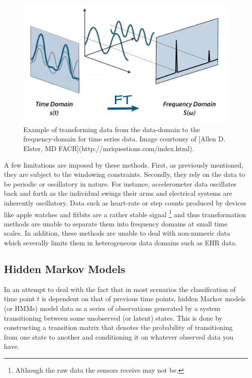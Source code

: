 \documentclass[]{book}
\let\rmarkdownfootnote\footnote%
\def\footnote{\protect\rmarkdownfootnote}
\theoremstyle{definition}
\theoremstyle{definition}
\theoremstyle{definition}
\theoremstyle{remark}
\begin{document}
\begin{figure}

{\centering \includegraphics[width=0.6\linewidth]{figures/fourier_transform} 

}

\caption{Example of transforming data from the data-domain to the frequency-domain for time series data. Image courtousy of [Allen D. Elster, MD FACR](http://mriquestions.com/index.html).}\label{fig:fouriertransform}
\end{figure}

A few limitations are imposed by these methods. First, as previously
mentioned, they are subject to the windowing constraints. Secondly, they
rely on the data to be periodic or oscillatory in nature. For instance,
accelerometer data oscillates back and forth as the individual swings
their arms and electrical systems are inherently oscillatory. Data such
as heart-rate or step counts produced by devices like apple watches and
fitbits are a rather stable signal \footnote{Although the raw data the
  sensors receive may not be.} and thus transformation methods are
unable to separate them into frequency domains at small time scales. In
addition, these methods are unable to deal with non-numeric data which
severally limits them in heterogeneous data domains such as EHR data.

\subsection{Hidden Markov Models}\label{hidden-markov-models}

In an attempt to deal with the fact that in most scenarios the
classification of time point \(t\) is dependent on that of previous time
points, hidden Markov models (or HMMs) model data as a series of
observations generated by a system transitioning between some unobserved
(or latent) states. This is done by constructing a transition matrix
that denotes the probability of transitioning from one state to another
and conditioning it on whatever observed data you have.
\end{document}
